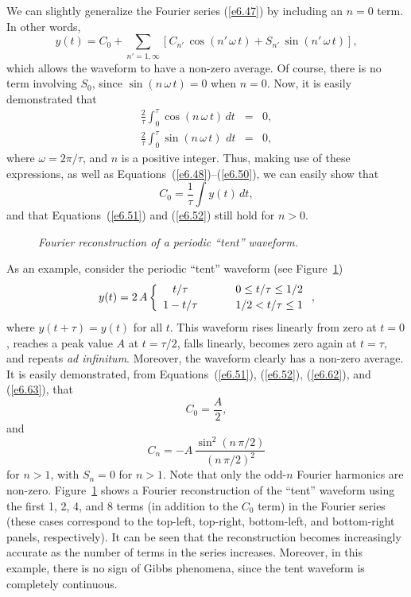 We can slightly generalize the Fourier series (\ref{e6.47}) by including an $n=0$
term. In other words,
\begin{equation}
y(t) = C_0+ \sum_{n'=1,\infty} \left[C_{n'}\,\cos(n'\,\omega\,t)+ S_{n'}\,\sin(n'\,\omega\,t)\right],
\end{equation}
which allows the waveform to have a non-zero average.
Of course, there is no term involving $S_0$, since $\sin (n\,\omega\,t)=0$ when $n=0$. 
Now, it is easily demonstrated that 
\begin{eqnarray}
\frac{2}{\tau} \int_0^\tau \cos(n\,\omega\,t)\,dt &=& 0,\\[0.5ex]
\frac{2}{\tau} \int_0^\tau \sin(n\,\omega\,t)\,\,dt &=& 0,
\end{eqnarray}
where $\omega=2\pi/\tau$, and $n$ is a positive integer. Thus, making use of these expressions, as
well as Equations~(\ref{e6.48})--(\ref{e6.50}), we can easily show that
\begin{equation}\label{e6.62}
C_0 = \frac{1}{\tau}\int y(t)\,dt,
\end{equation}
and that Equations~(\ref{e6.51}) and (\ref{e6.52}) still hold for $n>0$. 

\begin{figure}
\epsfysize=4in
\centerline{}
\caption{\em Fourier reconstruction of a periodic ``tent'' waveform.}\label{f6.7}   
\end{figure}

As an example, consider the periodic ``tent'' waveform (see Figure~\ref{f6.7})
\begin{equation}\label{e6.63}
y(t) = 2\,A\left\{
\begin{array}{ccc}
t/\tau&\mbox{\hspace{0.5cm}}&0\leq t/\tau\leq 1/2\\[0.5ex]
1-t/\tau &&1/2< t/\tau \leq 1
\end{array}\right.,
\end{equation}
where $y(t+\tau)=y(t)$ for all $t$. This waveform rises linearly from  zero at $t=0$, reaches  a peak value $A$ at $t=\tau/2$,   falls
linearly, becomes zero again at $t=\tau$, and  repeats
{\em ad infinitum}. Moreover, the waveform clearly has a non-zero average. 
It is easily demonstrated, from Equations~(\ref{e6.51}), (\ref{e6.52}), (\ref{e6.62}), and (\ref{e6.63}), that
\begin{equation}
C_0 = \frac{A}{2},
\end{equation}
and
\begin{equation}
C_n = - A\,\frac{\sin^2(n\,\pi/2)}{(n\,\pi/2)^2}
\end{equation}
for $n>1$, with $S_n=0$ for $n>1$. Note that only the odd-$n$ Fourier harmonics
are non-zero. 
Figure~\ref{f6.7} shows
a Fourier reconstruction of the ``tent'' waveform using the first 1, 2,  4, and 8 terms (in addition to the $C_0$ term) in the Fourier series (these cases correspond to the top-left, top-right,
bottom-left, and bottom-right panels, respectively). It can be seen that the reconstruction
becomes increasingly accurate as the number of terms  in the series increases.
Moreover, in this example, there is no sign of Gibbs phenomena,
since the tent waveform is completely continuous. 

